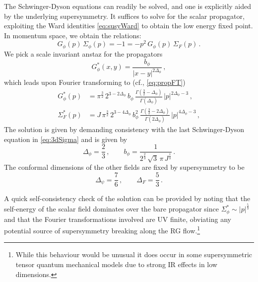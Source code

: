 \documentclass[11pt]{article}
\begin{document}
The Schwinger-Dyson equations can readily be solved, and one is explicitly aided by the underlying supersymmetry. It suffices to solve for the scalar propagator, exploiting the Ward identities \eqref{eq:susyWard} to obtain the low energy fixed point.  In momentum space, we obtain the relations:
%
\begin{equation}\label{eq:IRward}
G_\phi(p) \, \Sigma_\phi(p) = - 1 = -p^2\, G_\phi(p) \, \Sigma_F(p) \,.
\end{equation}	
%
We pick  a scale invariant anstaz for the propagators
%
\begin{equation}\label{eq:Gphiansatz}
G^*_\phi(x,y) = \frac{b_\phi}{|x-y|^{2\Delta_\phi}} \,,
\end{equation}	
%
which leads upon Fourier transforming to (cf., \eqref{eq:propFT})
%
\begin{equation}
\begin{split}
G^*_\phi(p) 
&= 
	\pi^\frac{3}{2} \, 2^{3-2\Delta_\phi} \, b_\phi \, \frac{\Gamma(\frac{3}{2} - \Delta_\phi)}{\Gamma(\Delta_\phi)} \, 
	|p|^{2\Delta_\phi -3} \,, \\
\Sigma^*_F(p) 
&= 
	J\, \pi^\frac{3}{2} \, 2^{3-4\Delta_\phi} \, b_\phi^2 \, \frac{\Gamma(\frac{3}{2} - 2\Delta_\phi)}{\Gamma(2\Delta_\phi)} \, 
	|p|^{4\Delta_\phi -3} \,,
\end{split}
\end{equation}
%
The solution is given by demanding consistency with the last Schwinger-Dyson equation  in \eqref{eq:3dSigma} and is given by
%
\begin{equation}\label{eq:Dbphi}
\Delta_\phi = \frac{2}{3} \,, \qquad b_\phi = \frac{1}{2^\frac{2}{3} \, \sqrt{3}\, \pi\, J^\frac{1}{3}} \,.
\end{equation}	
%
 The conformal dimensions of the other fields are fixed by supersymmetry to be 
\begin{equation}
\Delta_\psi = \frac{7}{6} \,, \qquad \Delta_F = \frac{5}{3} \,.
\end{equation}	
%

A quick self-consistency check of the solution can be provided by noting that the self-energy of the scalar field dominates over the bare propagator since  $\Sigma^*_\phi \sim |p|^\frac{5}{3}$ and that the Fourier transformations involved are UV finite, obviating any potential source of supersymmetry breaking along the RG flow.\footnote{ While this behaviour would be unusual it does  occur in some supersymmetric tensor quantum mechanical models \cite{Chang:2018sve} due to strong IR effects in low dimensions. } 
\end{document}

